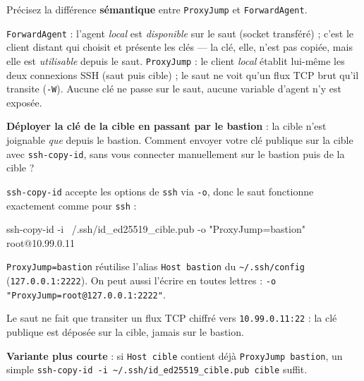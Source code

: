 \documentclass[a4paper,10pt]{exam}
\begin{document}
\begin{questions}
\question Précisez la différence \textbf{sémantique} entre \texttt{ProxyJump} et
\texttt{ForwardAgent}.
\begin{solution}
\texttt{ForwardAgent} : l'agent \emph{local} est \emph{disponible} sur le saut (socket
transféré) ; c'est le client distant qui choisit et présente les clés — la clé, elle,
n'est pas copiée, mais elle est \emph{utilisable} depuis le saut.
\texttt{ProxyJump} : le client \emph{local} établit lui-même les deux connexions SSH
(saut puis cible) ; le saut ne voit qu'un flux TCP brut qu'il transite (\texttt{-W}).
Aucune clé ne passe sur le saut, aucune variable d'agent n'y est exposée.
\end{solution}

\question \textbf{Déployer la clé de la cible en passant par le bastion} : la cible
n'est joignable \emph{que} depuis le bastion. Comment envoyer votre clé publique sur la
cible avec \texttt{ssh-copy-id}, sans vous connecter manuellement sur le bastion puis de
la cible ?
\begin{solution}
\texttt{ssh-copy-id} accepte les options de \texttt{ssh} via \texttt{-o}, donc le saut
fonctionne exactement comme pour \texttt{ssh} :

\begin{bashcode}
ssh-copy-id -i ~/.ssh/id_ed25519_cible.pub -o "ProxyJump=bastion" root@10.99.0.11
\end{bashcode}

\texttt{ProxyJump=bastion} réutilise l'alias \texttt{Host bastion} du
\texttt{\textasciitilde/.ssh/config} (\texttt{127.0.0.1:2222}). On peut aussi l'écrire en
toutes lettres : \texttt{-o "ProxyJump=root@127.0.0.1:2222"}.

Le saut ne fait que transiter un flux TCP chiffré vers \texttt{10.99.0.11:22} : la clé
publique est déposée sur la cible, jamais sur le bastion.

\textbf{Variante plus courte} : si \texttt{Host cible} contient déjà
\texttt{ProxyJump bastion}, un simple \texttt{ssh-copy-id -i
\textasciitilde/.ssh/id\_ed25519\_cible.pub cible} suffit.
\end{solution}


\end{questions}
\end{document}
